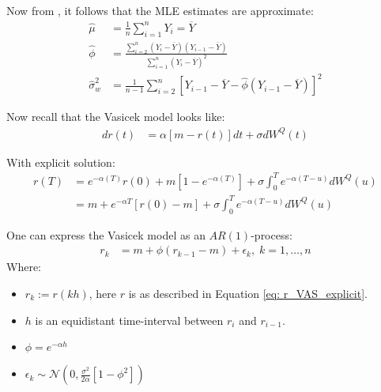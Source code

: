 Now from \cite{remillard2013statistical}, it follows that the MLE estimates are approximate: 
\begin{align*}
\hat{\mu} &= \frac{1}{n}\sum_{i=1}^{n}Y_{i} = \overline{Y} \\ 
\hat{\phi} &= \frac{
\sum_{i=2}^{n}(Y_{i}-\overline{Y})(Y_{i-1}-\overline{Y})
}{
\sum_{i=1}^{n}(Y_{i}-\overline{Y})^{2}
} \\ 
\hat{\sigma}^{2}_{w} &= 
\frac{1}{n-1}\sum_{i=2}^{n}[
Y_{i-1}-\overline{Y} -\hat{\phi}(Y_{i-1}-\overline{Y})
]^{2}
\end{align*}


Now recall that the Vasicek model looks like:
\begin{align*}
dr(t) &= \alpha[m - r(t)]dt + \sigma dW^{Q}(t)    
\end{align*}

With explicit solution:
\begin{align}
\label{eq: r_VAS_explicit}
r(T) &= e^{-\alpha(T)}r(0) + m[1-e^{-\alpha(T)}] 
+ \sigma \int_{0}^{T}e^{-\alpha(T-u)}dW^{Q}(u) \nonumber \\ 
&= 
m + e^{-\alpha T}\left[r(0) -m \right]
+ \sigma \int_{0}^{T}e^{-\alpha(T-u)}dW^{Q}(u)
\end{align} 


\begin{proposition}
One can express the Vasicek model as an $AR(1)$-process: 
\begin{align}
\label{eq: r_AR(1)}
r_{k} &= m + \phi (r_{k-1}-m) + \epsilon_{k}, \; k = 1, \dots, n     
\end{align}
Where:
\begin{itemize}[leftmargin =*]
    \item $r_{k} := r(kh)$, here $r$ is as described in Equation \ref{eq: r_VAS_explicit}. 
    \item $h$ is an equidistant time-interval between $r_{i}$ and $r_{i-1}$. 
    \item $\phi = e^{-\alpha h}$
    \item $\epsilon_{k} \sim \mathcal{N}\left(
    0, \frac{\sigma^{2}}{2\alpha}\left[
    1-\phi^{2}
    \right]\right)$
\end{itemize}
\end{proposition}

